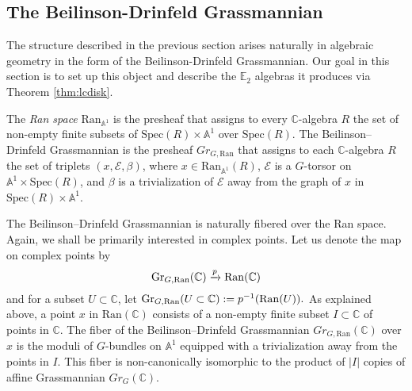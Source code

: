 \begin{comment}
\begin{rmk}
In fact, this theorem will be logically unnecessary for what follows and we include it only for completeness.  As such, we omit the definition of the term \emph{constructible cosheaf}.  
\end{rmk}

We summarize the preceding discussion by drawing the following corollary of Theorem~\ref{thm:lcdisk}:
\begin{cor} \label{cor:E2crit}
Let $\C$ be a symmetric monoidal $\infty$-category and $A \in \C$ be a $\mathrm{Fact}(\mathbb{C})$ algebra.  Suppose that $A$ has the property that for any inclusion $D\subset D' \subset \mathbb{C}$ of disks, the natural map $A(\mathrm{Ran}(D))\to A(\mathrm{Ran}(D'))$ is an equivalence.  Then, for any disk $D\subset \mathbb{C}$, $A(\mathrm{Ran}(D))$ inherits the structure of a non-unital $\mathbb{E}_2$-algebra in $\C$.  
\end{cor}
\end{comment}


\subsection{The Beilinson-Drinfeld Grassmannian}
The structure described in the previous section arises naturally in algebraic geometry in the form of the Beilinson-Drinfeld Grassmannian.  Our goal in this section is to set up this object and describe the $\mathbb{E}_2$ algebras it produces via Theorem \ref{thm:lcdisk}.

\begin{dfn}
The \textit{Ran space} $\text{Ran}_{\mathbb{A}^1}$ is the presheaf that assigns to every $\mathbb{C}$-algebra $R$ the set of non-empty finite subsets of $\text{Spec}(R) \times \mathbb{A}^1$ over $\text{Spec}(R)$.   The Beilinson--Drinfeld Grassmannian is the presheaf $Gr_{G,\text{Ran}}$ that assigns to each $\mathbb{C}$-algebra $R$ the set of triplets $(x,\mathcal{E},\beta)$, where $x \in \text{Ran}_{\mathbb{A}^1}(R)$, $\mathcal{E}$ is a $G$-torsor on $\mathbb{A}^1 \times \text{Spec}(R)$, and $\beta$ is a trivialization of $\mathcal{E}$ away from the graph of $x$ in $\text{Spec}(R) \times \mathbb{A}^1$.
\end{dfn}

The Beilinson--Drinfeld Grassmannian is naturally fibered over the Ran space.  Again, we shall be primarily interested in complex points.  Let us denote the map on complex points by $$\operatorname{\mathrm{Gr}}_{G,\operatorname{\mathrm{Ran}}}(\mathbb{C}) \xrightarrow{p} \operatorname{\mathrm{Ran}}(\mathbb{C})$$ and for a subset $U\subset \mathbb{C}$, let $\operatorname{\mathrm{Gr}}_{G,\operatorname{\mathrm{Ran}}}(U\subset \mathbb{C}):= p^{-1}(\operatorname{\mathrm{Ran}}(U)).$   As explained above, a point $x$ in $\text{Ran}(\mathbb{C})$ consists of a non-empty finite subset $I \subset \mathbb{C}$ of points in $\mathbb{C}$.  The fiber of the Beilinson--Drinfeld Grassmannian $Gr_{G,\text{Ran}}(\mathbb{C})$ over $x$ is the moduli of $G$-bundles on $\mathbb{A}^1$ equipped with a trivialization away from the points in $I$.  This fiber is non-canonically isomorphic to the product of $|I|$ copies of affine Grassmannian $Gr_G(\mathbb{C})$.  

